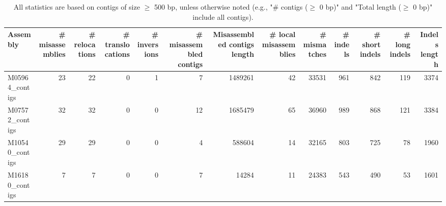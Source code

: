 \documentclass[12pt,a4paper]{article}
\begin{document}
\begin{table}[ht]
\begin{center}
\caption{All statistics are based on contigs of size $\geq$ 500 bp, unless otherwise noted (e.g., "\# contigs ($\geq$ 0 bp)" and "Total length ($\geq$ 0 bp)" include all contigs).}
\begin{tabular}{|l*{12}{|r}|}
\hline
Assembly & \# misassemblies &     \# relocations &     \# translocations &     \# inversions & \# misassembled contigs & Misassembled contigs length & \# local misassemblies & \# mismatches & \# indels &     \# short indels &     \# long indels & Indels length \\ \hline
M05964\_contigs & 23 & 22 & 0 & 1 & 7 & 1489261 & 42 & 33531 & 961 & 842 & 119 & 3374 \\ \hline
M07572\_contigs & 32 & 32 & 0 & 0 & 12 & 1685479 & 65 & 36960 & 989 & 868 & 121 & 3384 \\ \hline
M10540\_contigs & 29 & 29 & 0 & 0 & 4 & 588604 & 14 & 32165 & 803 & 725 & 78 & 1960 \\ \hline
M16180\_contigs & 7 & 7 & 0 & 0 & 7 & 14284 & 11 & 24383 & 543 & 490 & 53 & 1601 \\ \hline
\end{tabular}
\end{center}
\end{table}
\end{document}

